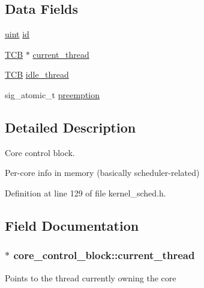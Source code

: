 \subsection*{Data Fields}
\begin{DoxyCompactItemize}
\item 
\hyperlink{bios_8h_a91ad9478d81a7aaf2593e8d9c3d06a14}{uint} \hyperlink{structcore__control__block_a5208867f309bdd1656fd473f38b30bfe}{id}
\item 
\hyperlink{group__scheduler_gaf88d9c946bf70b36a1e8bc34383abfc9}{T\+CB} $\ast$ \hyperlink{structcore__control__block_aac649db5b9a99e693ed21c7e610834bf}{current\+\_\+thread}
\item 
\hyperlink{group__scheduler_gaf88d9c946bf70b36a1e8bc34383abfc9}{T\+CB} \hyperlink{structcore__control__block_a6dd29dab4a95ce740f45370345408c52}{idle\+\_\+thread}
\item 
sig\+\_\+atomic\+\_\+t \hyperlink{structcore__control__block_a858cde45d4478d73f60e839594b363f4}{preemption}
\end{DoxyCompactItemize}


\subsection{Detailed Description}
Core control block. 

Per-\/core info in memory (basically scheduler-\/related) 

Definition at line 129 of file kernel\+\_\+sched.\+h.



\subsection{Field Documentation}
\subsubsection[{\texorpdfstring{current\+\_\+thread}{current_thread}}]{$\ast$ core\+\_\+control\+\_\+block\+::current\+\_\+thread}\hypertarget{structcore__control__block_aac649db5b9a99e693ed21c7e610834bf}{}\label{structcore__control__block_aac649db5b9a99e693ed21c7e610834bf}
Points to the thread currently owning the core 

